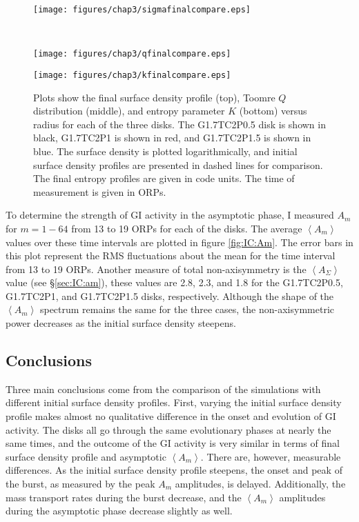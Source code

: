 \begin{figure}[p]
\centering
{}
\begin{minipage}[t]{6.3in}
\centering
\texttt{[image: figures/chap3/sigmafinalcompare.eps]}
\end{minipage}\\
\begin{minipage}[t]{6.3in}
\centering
\texttt{[image: figures/chap3/qfinalcompare.eps]}
\end{minipage}
\begin{minipage}[t]{6.3in}
\centering
\texttt{[image: figures/chap3/kfinalcompare.eps]}
\end{minipage}
\caption[Surface density, Toomre $Q$, and entropy for the end of simulations with varying initial surface density profiles]{Plots show the final surface density profile (top), Toomre $Q$ distribution (middle), and entropy parameter $K$ (bottom) versus radius for each of the three disks. The G1.7TC2P0.5 disk is shown in black, G1.7TC2P1 is shown in red, and G1.7TC2P1.5 is shown in blue. The surface density is plotted logarithmically, and initial surface density profiles are presented in dashed lines for comparison. The final entropy profiles are given in code units. The time of measurement is given in ORPs.}
\label{fig:IC:constq}
\end{figure}

To determine the strength of GI activity in the asymptotic phase, I measured $A_m$ for $m=1-64$ from 13 to 19 ORPs for each of the disks. The average $\left< A_m \right>$ values over these time intervals are plotted in figure \ref{fig:IC:Am}. The error bars in this plot represent the RMS fluctuations about the mean for the time interval from 13 to 19 ORPs. Another measure of total non-axisymmetry is the $\left<A_\Sigma\right>$ value (see \S\ref{sec:IC:am}), these values are 2.8, 2.3, and 1.8 for the G1.7TC2P0.5, G1.7TC2P1, and G1.7TC2P1.5 disks, respectively. Although the shape of the $\left< A_m \right>$ spectrum remains the same for the three cases, the non-axisymmetric power decreases as the initial surface density steepens.

\subsection{Conclusions} 

Three main conclusions come from the comparison of the simulations with different initial surface density profiles. First, varying the initial surface density profile makes almost no qualitative difference in the onset and evolution of GI activity. The disks all go through the same evolutionary phases at nearly the same times, and the outcome of the GI activity is very similar in terms of final surface density profile and asymptotic $\left< A_m \right>$. There are, however, measurable differences. As the initial surface density profile steepens, the onset and peak of the burst, as measured by the peak $A_m$ amplitudes, is delayed. Additionally, the mass transport rates during the burst decrease, and the $\left< A_m \right>$ amplitudes during the asymptotic phase decrease slightly as well. 

